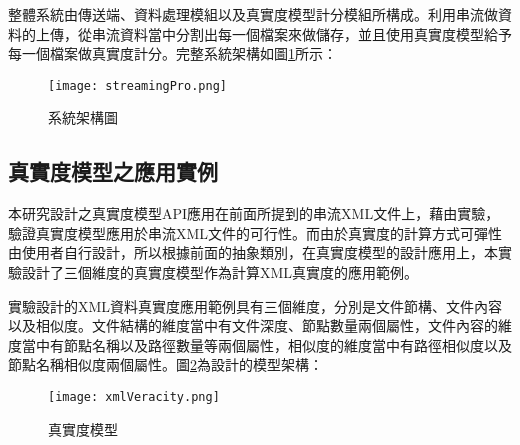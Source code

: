 整體系統由傳送端、資料處理模組以及真實度模型計分模組所構成。利用串流做資料的上傳，從串流資料當中分割出每一個檔案來做儲存，並且使用真實度模型給予每一個檔案做真實度計分。完整系統架構如圖\ref{system}所示：
\begin{figure}[H]
\centering
\graphicspath{{/Users/FUDA/Documents/masterThesis/image/}}
\texttt{[image: streamingPro.png]}
\caption{系統架構圖}
\label{system}
\end{figure}
\newpage
\subsection{真實度模型之應用實例}
本研究設計之真實度模型API應用在前面所提到的串流XML文件上，藉由實驗，驗證真實度模型應用於串流XML文件的可行性。而由於真實度的計算方式可彈性由使用者自行設計，所以根據前面的抽象類別，在真實度模型的設計應用上，本實驗設計了三個維度的真實度模型作為計算XML真實度的應用範例。\\\par
實驗設計的XML資料真實度應用範例具有三個維度，分別是文件節構、文件內容以及相似度。文件結構的維度當中有文件深度、節點數量兩個屬性，文件內容的維度當中有節點名稱以及路徑數量等兩個屬性，相似度的維度當中有路徑相似度以及節點名稱相似度兩個屬性。圖\ref{veracitymodel}為設計的模型架構：
\begin{figure}[H]
\centering
\graphicspath{{/Users/FUDA/Documents/masterThesis/image/}}
\texttt{[image: xmlVeracity.png]}
\caption{真實度模型}
\label{veracitymodel}
\end{figure}

